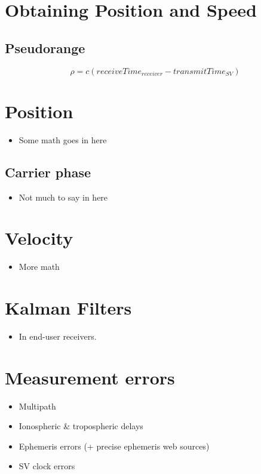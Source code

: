 \section{Obtaining Position and Speed}

\subsection{Pseudorange}

%
\[\rho = c (receiveTime_{receiver} - transmitTime_{SV})\]
%

\section{Position}
\begin{itemize}
\item Some math goes in here
\end{itemize}

\subsection{Carrier phase}
\begin{itemize}
\item Not much to say in here
\end{itemize}

\section{Velocity}
\begin{itemize}
\item More math
\end{itemize}

\section{Kalman Filters}
\begin{itemize}
\item In end-user receivers.
\end{itemize}

\section{Measurement errors}
\begin{itemize}
\item Multipath
\item Ionospheric \& tropospheric delays
\item Ephemeris errors (+ precise ephemeris web sources)
\item SV clock errors
\end{itemize}

